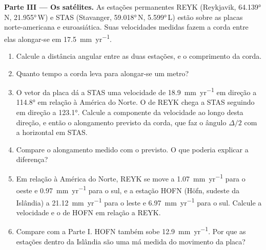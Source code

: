 \begin{problem}
\noindent\textbf{Parte III --- Os satélites.}
As estações permanentes REYK (Reykjavik, \ang{64.139}\,N, \ang{21.955}\,W) e
STAS (Stavanger, \ang{59.018}\,N, \ang{5.599}\,L) estão sobre as placas norte-americana e
euroasiática. Suas velocidades medidas fazem a corda entre elas alongar-se
em \qty{17.5}{mm.yr^{-1}}.
\begin{enumerate}[resume]
  \item Calcule a distância angular entre as duas estações, e o comprimento
        da corda.
  \item Quanto tempo a corda leva para alongar-se um metro?
  \item O vetor da placa dá a STAS uma velocidade de \qty{18.9}{mm.yr^{-1}} em direção a
        \ang{114.8} em relação à América do Norte. O  de REYK
        chega a STAS seguindo em direção a \ang{123.1}. Calcule a componente da velocidade ao longo desta direção, e então o alongamento previsto da
        corda, que faz o ângulo $\Delta/2$ com a horizontal em STAS.
  \item Compare o alongamento medido com o previsto. O que poderia explicar a
        diferença?
  \item Em relação à América do Norte, REYK se move a \qty{1.07}{mm.yr^{-1}} para o oeste e \qty{0.97}{mm.yr^{-1}} para o sul, e a estação HOFN (Höfn,
        sudeste da Islândia) a \qty{21.12}{mm.yr^{-1}} para o leste e
        \qty{6.97}{mm.yr^{-1}} para o sul. Calcule a velocidade e o  de HOFN
        em relação a REYK.
  \item Compare com a Parte I. HOFN também sobe \qty{12.9}{mm.yr^{-1}}. Por que as
        estações dentro da Islândia são uma má medida do movimento da placa?
\end{enumerate}


\end{problem}
